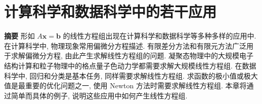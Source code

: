 \clearpage
\section{{计算科学和数据科学中的若干应用}}\label{chap:computational-applications}
\setcounter{footnote}{0}
\noindent\textbf{{摘要}}\quad
{形如 $A\boldsymbol{x}=\boldsymbol{b}$ 的线性方程组出现在计算科学和数据科学等多种多样的应用中. 在计算科学中, 物理现象常用偏微分方程描述. 有限差分方法和有限元方法广泛用于求解偏微分方程, 由此产生求解线性方程组的问题. 凝聚态物理中的大规模电子结构计算和粒子物理中的格点量子色动力学都需要求解大规模线性方程组. 在数据科学中, 回归和分类是基本任务, 同样需要求解线性方程组. 求函数的极小值或极大值是最重要的优化问题之一, 使用 Newton 方法时需要求解线性方程组. 本章将通过简单而具体的例子, 说明这些应用中如何产生线性方程组.}
